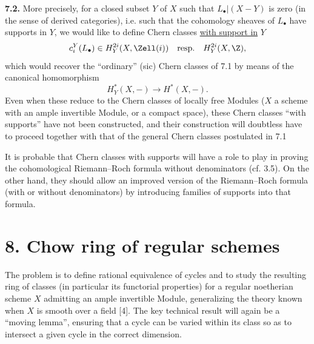 \textbf{7.2.} More precisely, for a closed subset $Y$ of $X$ such that $L_\bullet|(X-Y)$ is zero (in the sense of derived categories), i.e. such that the cohomology sheaves of $L_\bullet$ have supports in $Y$, we would like to define Chern classes \uline{with support in} $Y$
\[
 c_i^Y(L_\bullet)\in H_Y^{2i}(X,\Zell(i))\quad\text{resp.}\quad H_Y^{2i}(X,\Z),
\]
which would recover the ``ordinary'' (sic) Chern classes of 7.1 by means of the canonical homomorphism
\[
 H_Y^*(X,-)\longrightarrow H^*(X,-).
\]
%
Even when these reduce to the Chern classes of locally free Modules ($X$ a scheme with an ample invertible Module, or a compact space), these Chern classes ``with supports'' have not been constructed, and their construction will doubtless have to proceed together with that of the general Chern classes postulated in 7.1

It is probable that Chern classes with supports will have a role to play in proving the cohomological Riemann--Roch formula without denominators (cf. 3.5). On the other hand, they should allow an improved version of the Riemann--Roch formula (with or without denominators) by introducing families of supports into that formula.

\section*{8. Chow ring of regular schemes}

The problem is to define rational equivalence of cycles and to study the resulting ring of classes (in particular its functorial properties) for a regular noetherian scheme $X$ admitting an ample invertible Module, generalizing the theory known when $X$ is smooth over a field [4]. The key technical result will again be a ``moving lemma'', ensuring that a cycle can be varied within its class so as to intersect a given cycle in the correct dimension.

